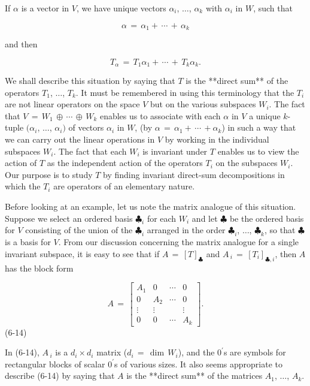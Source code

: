 If \(\alpha\) is a vector in \(V\), we have unique vectors \(\alpha_{i}\), \(\ldots\), \(\alpha_{k}\) with \(\alpha_{i}\) in \(W\), such that

\[\alpha\,=\,\alpha_{1}+\,\cdots\,+\,\alpha_{k}\]

and then

\[T_{\alpha}\,=\,T_{1}\alpha_{1}+\,\cdots\,+\,T_{k}\alpha_{k}.\]

We shall describe this situation by saying that \(T\) is the **direct sum** of the operators \(T_{1}\), \(\ldots\), \(T_{k}\). It must be remembered in using this terminology that the \(T_{i}\) are not linear operators on the space \(V\) but on the various subspaces \(W_{i}\). The fact that \(V\,=\,W_{1}\,\oplus\,\cdots\,\oplus\,W_{k}\) enables us to associate with each \(\alpha\) in \(V\) a unique \(k\)-tuple \((\alpha_{i}\), \(\ldots\), \(\alpha_{i})\) of vectors \(\alpha_{i}\) in \(W\), (by \(\alpha\,=\,\alpha_{1}+\,\cdots\,+\alpha_{k}\)) in such a way that we can carry out the linear operations in \(V\) by working in the individual subspaces \(W_{i}\). The fact that each \(W_{i}\) is invariant under \(T\) enables us to view the action of \(T\) as the independent action of the operators \(T_{i}\) on the subspaces \(W_{i}\). Our purpose is to study \(T\) by finding invariant direct-sum decompositions in which the \(T_{i}\) are operators of an elementary nature.

Before looking at an example, let us note the matrix analogue of this situation. Suppose we select an ordered basis \(\clubsuit_{i}\) for each \(W_{i}\) and let \(\clubsuit\) be the ordered basis for \(V\) consisting of the union of the \(\clubsuit_{i}\) arranged in the order \(\clubsuit_{i}\), \(\ldots\), \(\clubsuit_{k}\), so that \(\clubsuit\) is a basis for \(V\). From our discussion concerning the matrix analogue for a single invariant subspace, it is easy to see that if \(A\,=\,[T]_{\clubsuit}\) and \(A\,_{i}\,=\,[T_{i}]_{\clubsuit,i}\), then \(A\) has the block form

\[A\,=\,\begin{bmatrix}A_{1}&0&\cdots&0\\ 0&A_{2}&\cdots&0\\ \vdots&\vdots&&\vdots\\ 0&0&\cdots&A_{k}\end{bmatrix}.\] (6-14)

In (6-14), \(A\,_{i}\) is a \(d_{i}\,\mathsf{\times}\,d_{i}\) matrix (\(d_{i}\,=\,\dim\,W_{i}\)), and the \(0^{\prime}\)s are symbols for rectangular blocks of scalar \(0^{\prime}\)s of various sizes. It also seems appropriate to describe (6-14) by saying that \(A\) is the **direct sum** of the matrices \(A_{1}\), \(\ldots\), \(A_{k}\).

